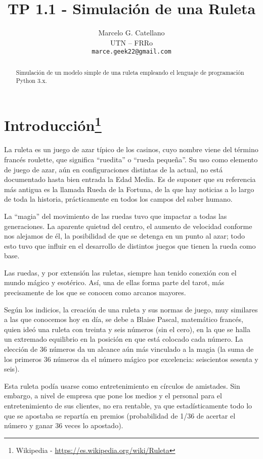\documentclass{article}
\title{TP 1.1 - Simulación de una Ruleta}
\author{
 Marcelo G. Catellano \\
  UTN -- FRRo \\
  \texttt{marce.geek22@gmail.com} \\
}
\begin{document}
\maketitle
\begin{abstract}
Simulación de un modelo simple de una ruleta empleando el lenguaje de programación Python 3.x.
\end{abstract}


\section[Introducción]{Introducción\footnote{Wikipedia - \url{https://es.wikipedia.org/wiki/Ruleta}}}
La ruleta es un juego de azar típico de los casinos, cuyo nombre viene del término francés roulette, que significa ``ruedita'' o ``rueda pequeña''. Su uso como elemento de juego de azar, aún en configuraciones distintas de la actual, no está documentado hasta bien entrada la Edad Media. Es de suponer que su referencia más antigua es la llamada Rueda de la Fortuna, de la que hay noticias a lo largo de toda la historia, prácticamente en todos los campos del saber humano.

La ``magia'' del movimiento de las ruedas tuvo que impactar a todas las generaciones. La aparente quietud del centro, el aumento de velocidad conforme nos alejamos de él, la posibilidad de que se detenga en un punto al azar; todo esto tuvo que influir en el desarrollo de distintos juegos que tienen la rueda como base.

Las ruedas, y por extensión las ruletas, siempre han tenido conexión con el mundo mágico y esotérico. Así, una de ellas forma parte del tarot, más precisamente de los que se conocen como arcanos mayores.

Según los indicios, la creación de una ruleta y sus normas de juego, muy similares a las que conocemos hoy en día, se debe a Blaise Pascal, matemático francés, quien ideó una ruleta con treinta y seis números (sin el cero), en la que se halla un extremado equilibrio en la posición en que está colocado cada número. La elección de 36 números da un alcance aún más vinculado a la magia (la suma de los primeros 36 números da el número mágico por excelencia: seiscientos sesenta y seis).

Esta ruleta podía usarse como entretenimiento en círculos de amistades. Sin embargo, a nivel de empresa que pone los medios y el personal para el entretenimiento de sus clientes, no era rentable, ya que estadísticamente todo lo que se apostaba se repartía en premios (probabilidad de 1/36 de acertar el número y ganar 36 veces lo apostado).
\end{document}
